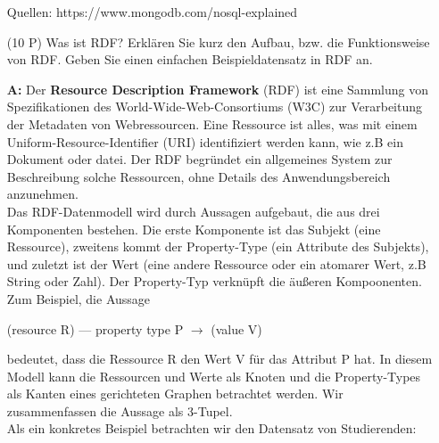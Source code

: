 \documentclass[12pt]{report}
\newcommand{\answer}{\textbf{A:}}
\begin{document}
\begin{enumerate}
Quellen: https://www.mongodb.com/nosql-explained



\item[(10 P)] Was ist RDF? Erklären Sie kurz den Aufbau, bzw. die Funktionsweise von RDF. Geben Sie einen einfachen Beispieldatensatz in RDF an.
\item[\answer]
  Der \textbf{Resource Description Framework} (RDF) ist eine Sammlung von Spezifikationen des World-Wide-Web-Consortiums (W3C) zur Verarbeitung der Metadaten von Webressourcen. Eine Ressource ist alles, was mit einem Uniform-Resource-Identifier (URI) identifiziert werden kann, wie z.B ein Dokument oder datei. Der RDF begründet ein allgemeines System zur Beschreibung solche Ressourcen, ohne Details des Anwendungsbereich anzunehmen.\\

  Das RDF-Datenmodell wird durch Aussagen aufgebaut, die aus drei Komponenten bestehen. Die erste Komponente ist das Subjekt (eine Ressource), zweitens kommt der Property-Type (ein Attribute des Subjekts), und zuletzt ist der Wert (eine andere Ressource oder ein atomarer Wert, z.B String oder Zahl). Der Property-Typ verknüpft die äußeren Kompoonenten. Zum Beispiel, die Aussage

  \begin{center}
    (resource R) --- property type P $\rightarrow$ (value V)
  \end{center}

  bedeutet, dass die Ressource R den Wert V für das Attribut P hat. In diesem Modell kann die Ressourcen und Werte als Knoten und die Property-Types als Kanten eines gerichteten Graphen betrachtet werden. Wir zusammenfassen die Aussage als 3-Tupel.\\

  Als ein konkretes Beispiel betrachten wir den Datensatz von Studierenden:


\end{enumerate}
\end{document}
